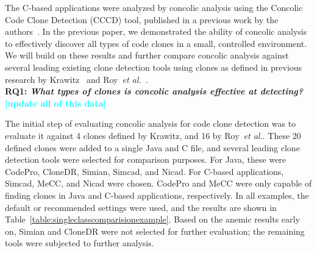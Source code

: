 \documentclass[smallextended]{svjour3}       %
\newcommand{\todo}[1]{\textcolor{cyan}{\textbf{[#1]}}}
\begin{document}
The C-based applications were analyzed by concolic analysis using the Concolic Code Clone Detection (CCCD) tool, published in a previous work by the authors~\cite{wcre2013}. In the previous paper, we demonstrated the ability of concolic analysis to effectively discover all types of code clones in a small, controlled environment. We will build on these results and further compare concolic analysis against several leading existing clone detection tools using clones as defined in previous research by Krawitz~\cite{Kraw2012} and Roy~\emph{et al.}~\cite{Roy:2009:CEC:1530898.1531101}. \\


\textbf{RQ1: \emph{What types of clones is concolic analysis effective at detecting?}}
\todo{update all of this data}

The initial step of evaluating concolic analysis for code clone detection was to evaluate it against 4 clones defined by Krawitz, and 16 by Roy~\emph{et al.}. These 20 defined clones were added to a single Java and C file, and several leading clone detection tools were selected for comparison purposes. For Java, these were CodePro, CloneDR, Simian, Simcad, and Nicad. For C-based applications, Simcad, MeCC, and Nicad were chosen. CodePro and MeCC were only capable of finding clones in Java and C-based applications, respectively. In all examples, the default or recommended settings were used, and the results are shown in Table~\ref{table:singleclasscomparisionexample}. Based on the anemic results early on, Simian and CloneDR were not selected for further evaluation; the remaining tools were subjected to further analysis.
\end{document}
